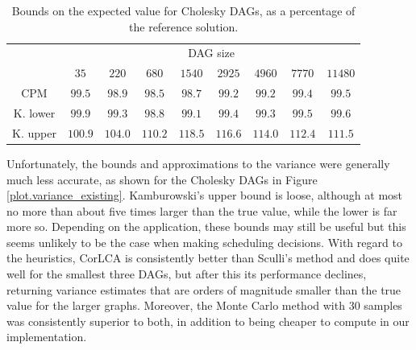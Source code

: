 \documentclass[12pt]{article}
\begin{document}
\begin{table}
	\caption{Bounds on the expected value for Cholesky DAGs, as a percentage of the reference solution.} 
	\begin{center}	
		\begin{tabular}{c c c c c c c c c}
                  \cmidrule{1-9}
                  & \multicolumn{8}{c}{DAG size} \\
                  \cmidrule{2-9}
			& $35$ & $220$ & $680$ & $1540$ & $2925$ & $4960$ & $7770$ & $11480$\\
			\cmidrule{1-9}
			CPM & $99.5$ & $98.9$ & $98.5$ & $98.7$ & $99.2$ & $99.2$ & $99.4$ & $99.5$\\
                  K. lower & $99.9$ & $99.3$ & $98.8$ & $99.1$ & $99.4$ & $99.3$ & $99.5$ & $99.6$\\
                  K. upper & $100.9$ & $104.0$ & $110.2$ & $118.5$ & $116.6$ & $114.0$ & $112.4$ & $111.5$\\
			\bottomrule
		\end{tabular}
		\label{tb.mean_existing}
	\end{center}	
      \end{table}



      Unfortunately, the bounds and approximations to the variance were generally much less accurate, as shown for the Cholesky DAGs in Figure \ref{plot.variance_existing}. Kamburowski's upper bound is loose, although at most no more than about five times larger than the true value, while the lower is far more so. Depending on the application, these bounds may still be useful but this seems unlikely to be the case when making scheduling decisions. With regard to the heuristics, CorLCA is consistently better than Sculli's method and does quite well for the smallest three DAGs, but after this its performance declines, returning variance estimates that are orders of magnitude smaller than the true value for the larger graphs. Moreover, the Monte Carlo method with 30 samples was consistently superior to both, in addition to being cheaper to compute in our implementation.
\end{document}
